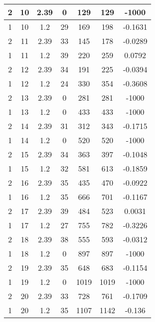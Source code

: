 \documentclass[letterpaper, 12pt]{article}
\begin{document}
\begin{longtable}{|c|c|c|c|c|c|c|}
\hline
2 & 10 & 2.39 & 0 & 129 & 129 & -1000 \\
\hline
1 & 10 & 1.2 & 29 & 169 & 198 & -0.1631 \\
\hline
2 & 11 & 2.39 & 33 & 145 & 178 & -0.0289 \\
\hline
1 & 11 & 1.2 & 39 & 220 & 259 & 0.0792 \\
\hline
2 & 12 & 2.39 & 34 & 191 & 225 & -0.0394 \\
\hline
1 & 12 & 1.2 & 24 & 330 & 354 & -0.3608 \\
\hline
2 & 13 & 2.39 & 0 & 281 & 281 & -1000 \\
\hline
1 & 13 & 1.2 & 0 & 433 & 433 & -1000 \\
\hline
2 & 14 & 2.39 & 31 & 312 & 343 & -0.1715 \\
\hline
1 & 14 & 1.2 & 0 & 520 & 520 & -1000 \\
\hline
2 & 15 & 2.39 & 34 & 363 & 397 & -0.1048 \\
\hline
1 & 15 & 1.2 & 32 & 581 & 613 & -0.1859 \\
\hline
2 & 16 & 2.39 & 35 & 435 & 470 & -0.0922 \\
\hline
1 & 16 & 1.2 & 35 & 666 & 701 & -0.1167 \\
\hline
2 & 17 & 2.39 & 39 & 484 & 523 & 0.0031 \\
\hline
1 & 17 & 1.2 & 27 & 755 & 782 & -0.3226 \\
\hline
2 & 18 & 2.39 & 38 & 555 & 593 & -0.0312 \\
\hline
1 & 18 & 1.2 & 0 & 897 & 897 & -1000 \\
\hline
2 & 19 & 2.39 & 35 & 648 & 683 & -0.1154 \\
\hline
1 & 19 & 1.2 & 0 & 1019 & 1019 & -1000 \\
\hline
2 & 20 & 2.39 & 33 & 728 & 761 & -0.1709 \\
\hline
1 & 20 & 1.2 & 35 & 1107 & 1142 & -0.136 \\
\hline
\end{longtable}
\end{document}
